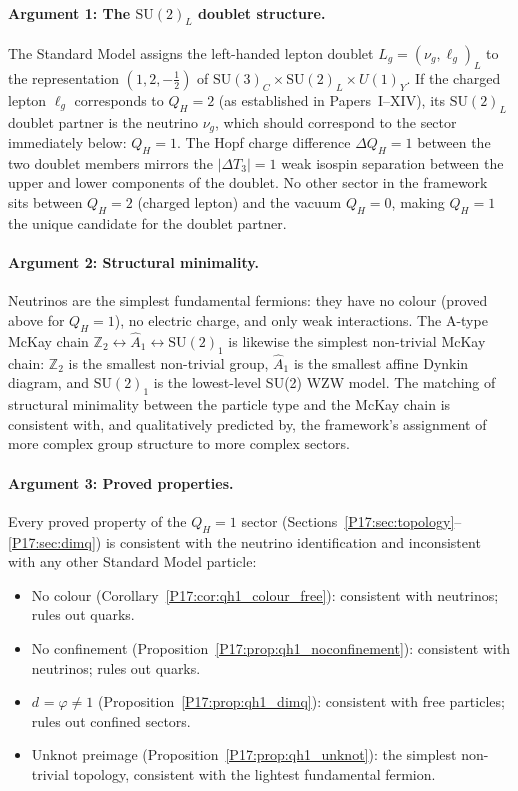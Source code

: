 \documentclass[11pt,a4paper]{article}
\theoremstyle{definition}\newtheorem{definition}[theorem]{Definition}
\theoremstyle{remark}
\newcommand{\vp}{\varphi}
\newcommand{\SU}{\mathrm{SU}}
\newcommand{\QH}{Q_H}
\newcommand{\Ztwo}{\mathbb{Z}_2}
\newcommand{\dimq}[1]{d_{#1}}
\begin{document}
\paragraph{Argument 1: The $\SU(2)_L$ doublet structure.}
The Standard Model assigns the left-handed lepton doublet
$L_g=(\nu_g,\ell_g)_L$ to the representation $(1,2,-\tfrac12)$ of
$\SU(3)_C\times\SU(2)_L\times U(1)_Y$. If the charged lepton $\ell_g$
corresponds to $\QH=2$ (as established in Papers~I--XIV), its
$\SU(2)_L$ doublet partner is the neutrino $\nu_g$, which should
correspond to the sector immediately below: $\QH=1$. The Hopf charge
difference $\Delta\QH=1$ between the two doublet members mirrors the
$|\Delta T_3|=1$ weak isospin separation between the upper and lower
components of the doublet. No other sector in the framework sits
between $\QH=2$ (charged lepton) and the vacuum $\QH=0$, making
$\QH=1$ the unique candidate for the doublet partner.

\paragraph{Argument 2: Structural minimality.}
Neutrinos are the simplest fundamental fermions: they have no colour
(proved above for $\QH=1$), no electric charge, and only weak
interactions. The A-type McKay chain
$\Ztwo\leftrightarrow\widehat{A}_1\leftrightarrow\SU(2)_1$ is
likewise the simplest non-trivial McKay chain: $\Ztwo$ is the smallest
non-trivial group, $\widehat{A}_1$ is the smallest affine Dynkin
diagram, and $\SU(2)_1$ is the lowest-level SU(2) WZW model. The
matching of structural minimality between the particle type and the
McKay chain is consistent with, and qualitatively predicted by, the
framework's assignment of more complex group structure to more
complex sectors.

\paragraph{Argument 3: Proved properties.}
Every proved property of the $\QH=1$ sector (Sections~\ref{P17:sec:topology}--\ref{P17:sec:dimq}) is consistent with the neutrino identification
and inconsistent with any other Standard Model particle:
\begin{itemize}[noitemsep]
\item No colour (Corollary~\ref{P17:cor:qh1_colour_free}):
  consistent with neutrinos; rules out quarks.
\item No confinement (Proposition~\ref{P17:prop:qh1_noconfinement}):
  consistent with neutrinos; rules out quarks.
\item $\dimq{}=\vp\neq1$ (Proposition~\ref{P17:prop:qh1_dimq}):
  consistent with free particles; rules out confined sectors.
\item Unknot preimage (Proposition~\ref{P17:prop:qh1_unknot}):
  the simplest non-trivial topology, consistent with the lightest
  fundamental fermion.
\end{itemize}
\end{document}
